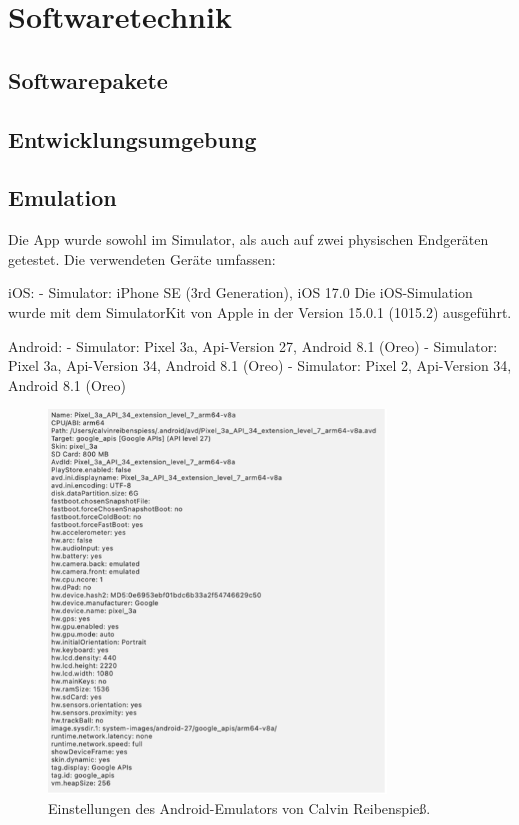 
\chapter{Softwaretechnik}

\section{Softwarepakete}

\section{Entwicklungsumgebung}

\section{Emulation}

Die App wurde sowohl im Simulator, als auch auf zwei physischen Endgeräten getestet.
Die verwendeten Geräte umfassen:

iOS:
-	Simulator: iPhone SE (3rd Generation), iOS 17.0
Die iOS-Simulation wurde mit dem SimulatorKit von Apple in der Version 15.0.1 (1015.2) ausgeführt.

Android:
-	Simulator: Pixel 3a, Api-Version 27, Android 8.1 (Oreo)
-	Simulator: Pixel 3a, Api-Version 34, Android 8.1 (Oreo)
-	Simulator: Pixel 2, Api-Version 34, Android 8.1 (Oreo)

\begin{figure}[H]
    \centering
    \includegraphics[width=0.8\textwidth]{images/android_emulator_reibenspiess.png}
    \caption{Einstellungen des Android-Emulators von Calvin Reibenspieß.}
    \label{branding}
\end{figure}

